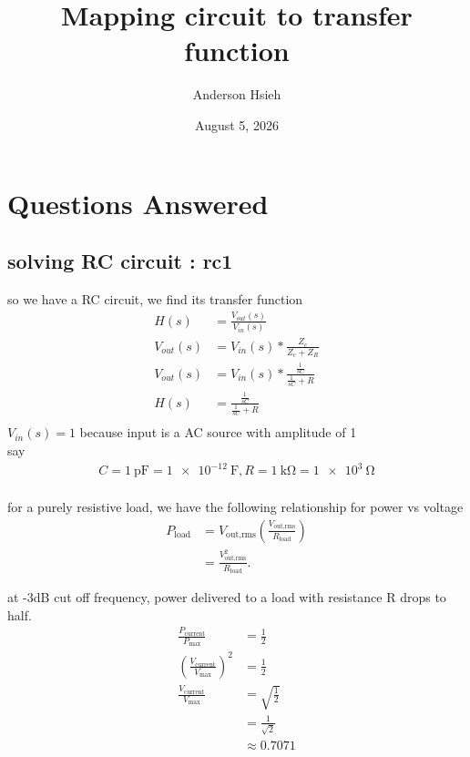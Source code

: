 \documentclass{article}
\title{Mapping circuit to transfer function}
\author{Anderson Hsieh}
\date{August 5, 2026}
\begin{document}
\maketitle

\section{Questions Answered}
    \subsection{solving RC circuit : rc1}
    so we have a RC circuit, we find its transfer function 
    \begin{align*}
        H(s)&=\frac{V_{out}(s)}{V_{in}(s)}\\
        V_{out}(s)&=V_{in}(s)*\frac{Z_c}{Z_c+Z_R}\\
        V_{out}(s)&=V_{in}(s)*\frac{\frac{1}{sC}}{\frac{1}{sC}+R}\\
        H(s)&=\frac{\frac{1}{sC}}{\frac{1}{sC}+R}\\
    \end{align*}
    $V_{in}(s) = 1$ because input is a AC source with amplitude of 1\\
    say 
    \begin{align*}
        C = \SI{1}{\pico\farad} = \SI{1e-12}{\farad}, R = \SI{1}{\kilo\ohm} = \SI{1e3}{\ohm}\\
    \end{align*}
    
    for a purely resistive load, we have the following relationship for power vs voltage
    \begin{align*}
        P_{\text{load}}&= V_{\text{out,rms}}
         \left(\frac{V_{\text{out,rms}}}{R_{\text{load}}}\right) \\
         &= \frac{V_{\text{out,rms}}^2}{R_{\text{load}}}.
    \end{align*}

    at -3dB cut off frequency, power delivered to a load with resistance R drops to half.
    \begin{align*}
        \frac{P_{\mathrm{current}}}{P_{\mathrm{max}}}&= \frac{1}{2} \\
        \left(\frac{V_{\mathrm{current}}}{V_{\mathrm{max}}}\right)^2&= \frac{1}{2} \\
        \frac{V_{\mathrm{current}}}{V_{\mathrm{max}}}&= \sqrt{\frac{1}{2}} \\
            &= \frac{1}{\sqrt{2}} \\
            &\approx 0.7071
    \end{align*}
\end{document}
